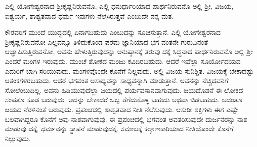 {\small ಎಲ್ಲಿ ಯೋಗೇಶ್ವರನಾದ ಶ್ರೀಕೃಷ್ಣನಿರುವನೊ, ಎಲ್ಲಿ ಧನುರ್ಧಾರಿಯಾದ ಪಾರ್ಥನಿರುವನೊ ಅಲ್ಲಿ ಶ್ರೀ, ವಿಜಯ, ಐಶ್ವರ್ಯ, ಶಾಶ್ವತವಾದ ಧರ್ಮ ಇವುಗಳು ನೆಲೆಸಿರುತ್ತವೆ ಎಂಬುದೇ ನನ್ನ ಮತ.}

ಕೌರವರಿಗೆ ಮುಂದೆ ಯುದ್ಧದಲ್ಲಿ ಏನಾಗಬಹುದು ಎಂಬುದನ್ನು ಸೂಚಿಸುತ್ತಾನೆ. ಎಲ್ಲಿ ಯೋಗೇಶ್ವರನಾದ ಶ್ರೀಕೃಷ್ಣನಿರುವನೋ ಎಲ್ಲವನ್ನೂ ತಿಳಿದುಕೊಂಡ ಪರಮ ಜ್ಞಾನಿಯಾದ ಭಗ ವಂತನೇ ಗುರುವಿನಂತೆ ಆಜ್ಞಾಪಿಸುತ್ತಿರುವನೋ, ಅವನು ಹೇಳುತ್ತಿರುವುದನ್ನು ಅನುಷ್ಠಾನಕ್ಕೆ ತರುವು ದಕ್ಕೆ ಸಿದ್ಧನಾದ ಪಾರ್ಥನಿರುವನೊ ಅಲ್ಲಿ ಶ್ರೀ ಎಂದರೆ ಮಂಗಳ ಇರುವುದು. ಮುಂಚೆ ಶೋಕದ ಮಂಜು ಕವಿದಿರಬಹುದು. ಆದರೆ ಇವೆಲ್ಲಾ ಸೂರ್ಯೋದಯದ ಎದುರಿಗೆ ಬಾಗಿ ಸರಿಯುವುದು. ಮಂಗಳವೊಂದೇ ಕೊನೆಗೆ ನಿಲ್ಲವುದು. ಅಲ್ಲಿ ವಿಜಯ ಸುನಿಶ್ಚಿತ. ವಿಜಯಕ್ಕೆ ಬೇಕಾದಷ್ಟು ಆತಂಕಗಳಿರಬಹುದು. ಆದರೆ ಭಗವಂತ ಅಸಾಧ್ಯವನ್ನು ಸಾಧ್ಯವನ್ನಾಗಿ ಮಾಡುತ್ತಾನೆ. ಅವನನ್ನು ನೆಚ್ಚಿದವನಿಗೆ ಸೋಲೆಂಬುದಿಲ್ಲ. ಅವನು ಹಿಡಿಯುವುದೆಲ್ಲಾ ಜಯದಲ್ಲಿ ಪರ್ಯವಸಾನವಾಗುವುದು. ಜಯದೊಡನೆ ಈ ಲೋಕದ ಸಂಪತ್ತೂ ಕೂಡ ಬರುವುದು. ಅದನ್ನು ಬೇಕಾದರೆ ಒಬ್ಬ ತೆಗೆದುಕೊಳ್ಳ ಬಹುದು ಅಥವಾ ಬಿಡಬಹುದು. ಅದಂತೂ ಜಯದ ನೆರಳಿನಂತೆ ಬರುವುದು. ಪ್ರಪಂಚದಲ್ಲಿ ಶಾಶ್ವತವಾದ ನೀತಿ ನೆಲೆಸುವುದು. ಆಸುರೀ ಶಕ್ತಿಗಳು ಈಗ ಎಷ್ಟೇ ಬಲವಾಗಿದ್ದರೂ ಕೊನೆಗೆ ಅವು ನಾಶವಾಗುವುವು. ಈ ಪ್ರಪಂಚದಲ್ಲಿ ಭಗವಂತ ಅವತರಿಸುವುದೇ ದುರ್ಜನರನ್ನು ನಾಶ ಮಾಡುವು ದಕ್ಕೆ, ಧರ್ಮವನ್ನು ಸ್ಥಾಪನೆ ಮಾಡುವುದಕ್ಕೆ. ಸಮಾಜಕ್ಕೆ ಕಲ್ಯಾಣಕಾರಿಯಾದ ನೀತಿಯೊಂದೇ ಕೊನೆಗೆ ನಿಲ್ಲುವುದು.


